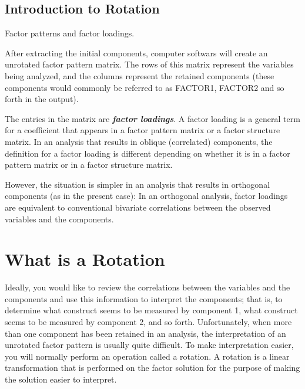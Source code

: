 \documentclass[a4paper,12pt]{article}
\begin{document}




\subsection{Introduction to Rotation}


Factor patterns and factor loadings.

After extracting the initial components, computer softwars
will create an unrotated factor pattern matrix. The rows of this matrix represent the variables
being analyzed, and the columns represent the retained components (these components would commonly be
referred to as FACTOR1, FACTOR2 and so forth in the output).

The entries in the matrix are \textbf{\emph{factor loadings}}. A factor loading is a general term for a coefficient
that appears in a factor pattern matrix or a factor structure matrix. In an analysis that results in
oblique (correlated) components, the definition for a factor loading is different depending on
whether it is in a factor pattern matrix or in a factor structure matrix.

However, the situation is simpler in an analysis that results in orthogonal components (as in the present case): In an
orthogonal analysis, factor loadings are equivalent to conventional bivariate correlations between the observed
variables and the components.

\section*{What is a Rotation}

Ideally, you would like to review the correlations between the variables and the
components and use this information to interpret the components; that is, to determine what
construct seems to be measured by component 1, what construct seems to be measured by
component 2, and so forth. Unfortunately, when more than one component has been retained in
an analysis, the interpretation of an unrotated factor pattern is usually quite difficult. To make
interpretation easier, you will normally perform an operation called a rotation. A rotation is a
linear transformation that is performed on the factor solution for the purpose of making the
solution easier to interpret.
\end{document}
